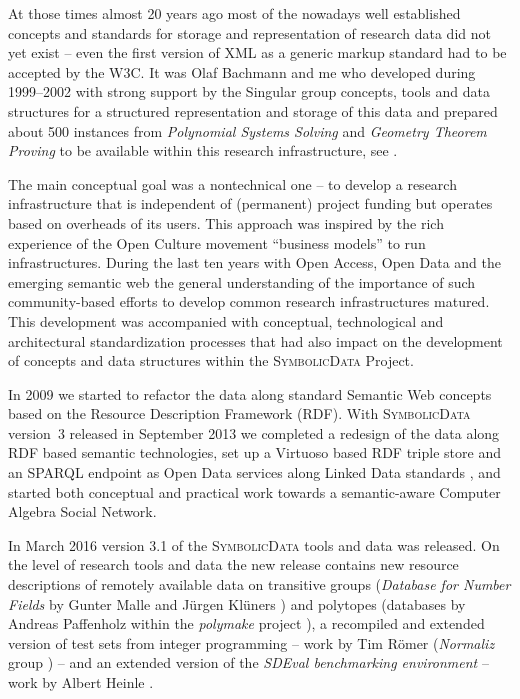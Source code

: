 \documentclass{mathincs}
\newcommand{\SD}{\textsc{Symbo\-lic\-Data}}
\begin{document}
At those times almost 20 years ago most of the nowadays well established
concepts and standards for storage and representation of research data did not
yet exist -- even the first version of XML as a generic markup standard had to
be accepted by the W3C. It was Olaf Bachmann and me who developed during
1999--2002 with strong support by the Singular group concepts, tools and data
structures for a structured representation and storage of this data and
prepared about 500 instances from \emph{Polynomial Systems Solving} and
\emph{Geometry Theorem Proving} to be available within this research
infrastructure, see \cite{Bachmann2000}.

The main conceptual goal was a nontechnical one -- to develop a research
infrastructure that is independent of (permanent) project funding but operates
based on overheads of its users. This approach was inspired by the rich
experience of the Open Culture movement ``business models'' to run
infrastructures.  During the last ten years with Open Access, Open Data and the
emerging semantic web the general understanding of the importance of such
community-based efforts to develop common research infrastructures matured.
This development was accompanied with conceptual, technological and
architectural standardization processes that had also impact on the development
of concepts and data structures within the {\SD} Project.

In 2009 we started to refactor the data along standard Semantic Web concepts
based on the Resource Description Framework (RDF).  With {\SD} version~3
released in September 2013 we completed a redesign of the data along RDF based
semantic technologies, set up a Virtuoso based RDF triple store and an SPARQL
endpoint as Open Data services along Linked Data standards \cite{lod}, and
started both conceptual and practical work towards a semantic-aware Computer
Algebra Social Network.

In March 2016 version 3.1 of the {\SD} tools and data was released. On the
level of research tools and data the new release contains new resource
descriptions of remotely available data on transitive groups (\emph{Database
  for Number Fields} by Gunter Malle and J\"urgen Kl\"uners
\cite{MalleKlueners}) and polytopes (databases by Andreas Paffenholz
\cite{Paffenholz} within the \emph{polymake} project \cite{polymake}), a
recompiled and extended version of test sets from integer programming -- work
by Tim R\"omer (\emph{Normaliz} group \cite{normaliz}) -- and an extended
version of the \emph{SDEval benchmarking environment} -- work by Albert Heinle
\cite{heinle-15}.
\end{document}
